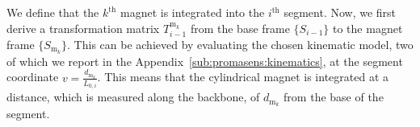 We define that the $k^\mathrm{th}$ magnet is integrated into the $i^\mathrm{th}$ segment. Now, we first derive a transformation matrix $T_{i-1}^{\mathrm{m}_k}$ from the base frame $\{S_{i-1}\}$ to the magnet frame $\{ S_{\mathrm{m}_k} \}$. 
This can be achieved by evaluating the chosen kinematic model, two of which we report in the Appendix~\ref{sub:promasens:kinematics}, at the segment coordinate $v = \frac{d_{\mathrm{m}_k}}{L_{0,i}}$. 
This means that the cylindrical magnet is integrated at a distance, which is measured along the backbone, of $d_{\mathrm{m}_k}$ from the base of the segment.


